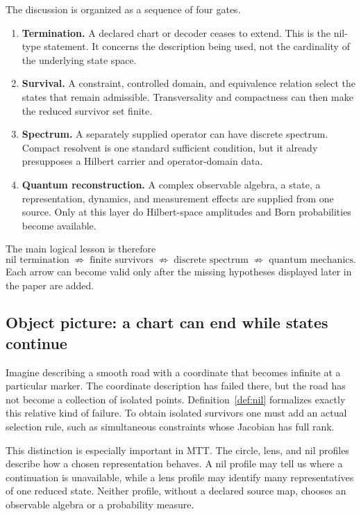 \documentclass[11pt]{article}
\begin{document}
The discussion is organized as a sequence of four gates.
\begin{enumerate}
\item \textbf{Termination.}  A declared chart or decoder ceases to extend.
This is the nil-type statement.  It concerns the description being used, not
the cardinality of the underlying state space.
\item \textbf{Survival.}  A constraint, controlled domain, and equivalence
relation select the states that remain admissible.  Transversality and
compactness can then make the reduced survivor set finite.
\item \textbf{Spectrum.}  A separately supplied operator can have discrete
spectrum.  Compact resolvent is one standard sufficient condition, but it
already presupposes a Hilbert carrier and operator-domain data.
\item \textbf{Quantum reconstruction.}  A complex observable algebra, a
state, a representation, dynamics, and measurement effects are supplied from
one source.  Only at this layer do Hilbert-space amplitudes and Born
probabilities become available.
\end{enumerate}
The main logical lesson is therefore
\[
 \text{nil termination}
 \;\not\Rightarrow\;
 \text{finite survivors}
 \;\not\Rightarrow\;
 \text{discrete spectrum}
 \;\not\Rightarrow\;
 \text{quantum mechanics}.
\]
Each arrow can become valid only after the missing hypotheses displayed later
in the paper are added.

\subsection{Object picture: a chart can end while states continue}

Imagine describing a smooth road with a coordinate that becomes infinite at a
particular marker.  The coordinate description has failed there, but the road
has not become a collection of isolated points.  Definition~\ref{def:nil}
formalizes exactly this relative kind of failure.  To obtain isolated
survivors one must add an actual selection rule, such as simultaneous
constraints whose Jacobian has full rank.

This distinction is especially important in MTT.  The circle, lens, and nil
profiles describe how a chosen representation behaves.  A nil profile may
tell us where a continuation is unavailable, while a lens profile may identify
many representatives of one reduced state.  Neither profile, without a
declared source map, chooses an observable algebra or a probability measure.
\end{document}
